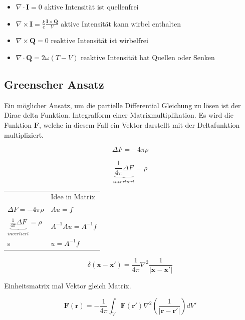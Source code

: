\begin{itemize}
\item $\nabla \cdot \mathbf{I} = 0$ aktive Intensität ist quellenfrei
\item $\nabla \times \mathbf{I} = \frac{k}{c} \frac{\mathbf{I} \times \mathbf{Q}}{V}$ aktive Intensität kann wirbel enthalten
\item $\nabla \times \mathbf{Q} = 0$ reaktive Intensität ist wirbelfrei
\item $\nabla \cdot \mathbf{Q} = 2 \omega (T-V)$ reaktive Intensität hat Quellen oder Senken
\end{itemize}


\subsection{Greenscher Ansatz}
Ein möglicher Ansatz, um die partielle Differential Gleichung zu lösen ist der Dirac delta Funktion. Integralform einer Matrixmultiplikation. Es wird die Funktion $\mathbf{F}$, welche in diesem Fall ein Vektor darstellt mit der Deltafunktion multipliziert.

\begin{equation}
\Delta F = -4 \pi \rho 
\label{helmholtz:DGL_idee}
\end{equation}

\begin{equation}
\underbrace{\frac{1}{4 \pi} \Delta F}_{invertiert} = \rho 
\label{helmholtz:DGL_idee_umformung}
\end{equation}

\begin{tabular}{ll}
  & Idee in Matrix \\
$\Delta F = -4 \pi \rho$  & $Au = f$ \\
$\underbrace{\frac{1}{4 \pi} \Delta F}_{invertiert} = \rho$ & $A^{-1}Au = A^{-1}f$  \\
s & $u = A^{-1}f$  \\
\end{tabular}

\begin{equation}
\delta (\mathbf{x} - \mathbf{x'}) = \frac{1}{4 \pi} \nabla^2 \frac{1}{|\mathbf{x} - \mathbf{x'}|}
\label{helmholtz:dirac}
\end{equation}

Einheitsmatrix mal Vektor gleich Matrix. 



\begin{equation}
\mathbf{F}(\mathbf{r}) = -\frac{1}{4\pi} \int_V \mathbf{F}(\mathbf{r}') \nabla^2 \left( \frac{1}{|\mathbf{r} - \mathbf{r}'|} \right) dV'
\end{equation}

